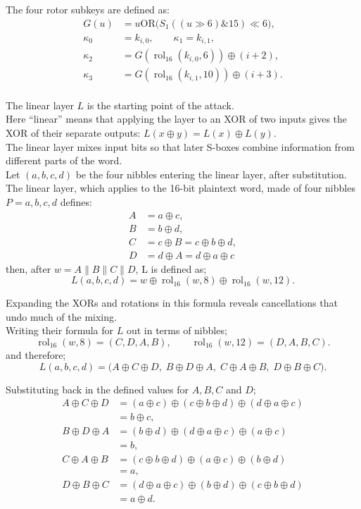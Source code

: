 \documentclass[11pt]{article}
\newcommand{\xor}{\mathbin\oplus}
\newcommand{\OR}{\mathbin{\mathrm{OR}}}
\newcommand{\rol}{\operatorname{rol}_{16}}
\begin{document}
The four rotor subkeys are defined as:
\[
\begin{split}
G(u)&=u\OR\bigl(S_1((u\gg6)\mathbin{\&}15)\ll6\bigr),\\
\kappa_0&=k_{i,0},\qquad \kappa_1=k_{i,1},\\
\kappa_2&=G(\rol(k_{i,0},6))\xor(i+2),\\
\kappa_3&=G(\rol(k_{i,1},10))\xor(i+3).
\end{split}
\]\\

The linear layer $L$ is the starting point of the attack.\\

 
Here ``linear'' means that applying the layer to an XOR of two inputs
gives the XOR of their separate outputs:
\(L(x\xor y)=L(x)\xor L(y)\).\\

The linear layer mixes input bits so that later S-boxes combine
information from different parts of the word.\\

Let \((a,b,c,d)\) be the four nibbles entering the linear layer, after substitution.\\

The linear layer, which applies to the 16-bit plaintext word, made of four nibbles $P = a,b,c,d$ defines:
\[
\begin{aligned}
	A&=a\oplus c,\\
	B&=b\oplus d,\\
	C&=c\oplus B=c\oplus b\oplus d,\\
	D&=d\oplus A=d\oplus a\oplus c
\end{aligned}
\]
then, after
\(w=A\|B\|C\|D\), L is defined as; \[
L(a,b,c,d)=w\oplus\rol(w,8)\oplus\rol(w,12). \]

Expanding the XORs and rotations in this formula reveals cancellations
that undo much of the mixing.\\

Writing their formula for $L$ out in terms of nibbles;
\[
\rol(w,8)=(C,D,A,B),\qquad
\rol(w,12)=(D,A,B,C).
\]
and therefore;
\[
L(a,b,c,d)=
\bigl(
A\oplus C\oplus D,\;
B\oplus D\oplus A,\;
C\oplus A\oplus B,\;
D\oplus B\oplus C
\bigr).
\]

Substituting back in the defined values for $A, B, C$ and $D$;
\[
\begin{aligned}
	A\oplus C\oplus D
	&=(a\oplus c)\oplus(c\oplus b\oplus d)
	\oplus(d\oplus a\oplus c)\\
	&=b\oplus c,\\[4pt]
	B\oplus D\oplus A
	&=(b\oplus d)\oplus(d\oplus a\oplus c)
	\oplus(a\oplus c)\\
	&=b,\\[4pt]
	C\oplus A\oplus B
	&=(c\oplus b\oplus d)\oplus(a\oplus c)
	\oplus(b\oplus d)\\
	&=a,\\[4pt]
	D\oplus B\oplus C
	&=(d\oplus a\oplus c)\oplus(b\oplus d)
	\oplus(c\oplus b\oplus d)\\
	&=a\oplus d.
\end{aligned}
\]
\end{document}
